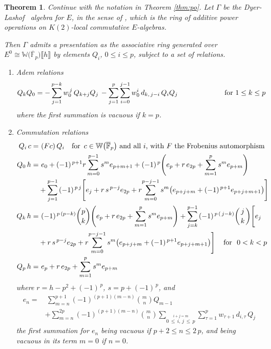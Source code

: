\documentclass{gtpart}
\newtheorem{thm}[equation]{Theorem}
\theoremstyle{definition}
\theoremstyle{remark}
\newcommand{\mb}[1]{\mathbb{#1}}
\newcommand{\cF}{\overline {\mb F}}
\newcommand{\DL}{Dyer-Lashof~}
\newcommand{\BW}{{\mb W}}
\newcommand{\G}{\Gamma}
\newcommand{\T}{\tau}
\newcommand{\lb}{\llbracket}
\newcommand{\rb}{\rrbracket}
\renewcommand{\=}{\approx}
\renewcommand{\-}{\sim}
\newcommand{\ch}[2]{{#1 \choose #2}}
\numberwithin{equation}{section}
\begin{document}
\begin{thm}
 \label{thm:DL}
 Continue with the notation in Theorem \ref{thm:po}.  Let $\G$ be the \DL 
 algebra for $E$, in the sense of \cite{cong}, which is the ring of additive 
 power operations on $K(2)$-local commutative $E$-algebras.  

 Then $\G$ admits a presentation as the associative ring generated over 
 $E^0 \cong \BW\big(\cF_p\big)\lb h \rb$ by elements $Q_i$, $0 \leq i \leq p$, 
 subject to a set of relations.  

 \begin{enumerate}[{\em (i)}]
  \item Adem relations 
  \[
   Q_k Q_0 = -\sum_{j = 1}^{p - k} w_0^{\,j} \, Q_{k + j} Q_j \, 
             - \sum_{j = 1}^p \sum_{i = 0}^{j - 1} w_0^i \, d_{k,\,j - i} \, 
             Q_i Q_j \hskip 2.3cm \text{for $1 \leq k \leq p$} 
  \]
  where the first summation is vacuous if $k = p$.  

  \item Commutation relations 
  \[
   \begin{split}
    Q_i \, c = & ~ (F c) \, Q_i ~~~ \text{for $\, c \in \BW\big(\cF_p\big)$ and 
                 all $i$, with $F$ the Frobenius automorphism} \\
    Q_0 \, h = & ~ e_0 + (-1)^{\,p + 1} r \sum_{m = 0}^{p - 1} s^m e_{p + m + 1} 
                 + (-1)^{\,p} \Bigg( e_p + r \, e_{2 p} 
                 + \sum_{m = 1}^p s^m e_{p + m} \Bigg) \\
               & + \sum_{j = 1}^{p - 1} \, (-1)^{\,p \, j} \Bigg[ e_j 
                 + r \, s^{\,p - j} e_{2 p} + r \! \sum_{m = 0}^{p - j - 1} s^m 
                   \big(e_{p + j + m} + (-1)^{\,p + 1} e_{p + j + m + 1}\big) 
                   \Bigg] \\
    Q_k \, h = & ~ (-1)^{\,p\,(p - k)} \ch{p}{k} \Bigg( e_p + r \, e_{2 p} 
                 + \sum_{m = 1}^p s^m e_{p + m} \Bigg) 
                 + \sum_{j = k}^{p - 1} \, (-1)^{\,p\,(\,j - k)} \ch{\,j\,}{k} 
                   \Bigg[ e_j \\
               & + r \, s^{\,p - j} e_{2 p} + r \! \sum_{m = 0}^{p - j - 1} s^m 
                   \big(e_{p + j + m} + (-1)^{\,p + 1} e_{p + j + m + 1}\big) 
                   \Bigg] ~~~\, \text{for \,\! $0 < k < p$} \\
    Q_p \, h = & ~ e_p + r \, e_{2 p} + \sum_{m = 1}^p s^m e_{p + m} 
   \end{split}
  \]
  where $r = h - p^2 + (-1)^{\,p}$, $s = p + (-1)^{\,p}$, and 
  \[
   \begin{split}
    e_n = & ~ \sum_{m = n}^{p + 1} (-1)^{(p + 1) (m - n)} \ch{m}{n} Q_{m - 1} \\
          & + \sum_{m = n}^{2 p} (-1)^{(p + 1) (m - n)} \ch{m}{n} 
              \sum_{\stackrel{\scriptstyle i + j = m} 
              {0 \,\leq\, i, \, j \,\leq\, p}} \sum_{\T = 1}^p 
              w_{\T + 1} \, d_{i,\T} \, Q_j 
   \end{split}
  \]
  the first summation for $e_n$ being vacuous if $p + 2 \leq n \leq 2\,p$, and 
  being vacuous in its term $m = 0$ if $n = 0$.  
 \end{enumerate}
\end{thm}
\end{document}
